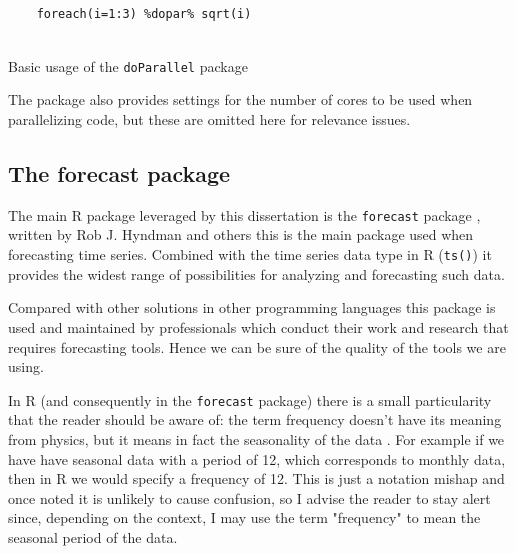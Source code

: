 \documentclass[12pt,a4paper,titlepage]{report}
\begin{document}
\begin{listing}[h]
    \begin{verbatim}
    
    foreach(i=1:3) %dopar% sqrt(i)    
    
    \end{verbatim}
    
    \caption{Basic usage of the \texttt{doParallel} package}
    \label{exampleparallelcode}
\end{listing}

The package also provides settings for the number of cores to be used when parallelizing code, but these are omitted here for relevance issues.

\subsection{The forecast package} \label{forecastpackagesection}

The main R package leveraged by this dissertation is the \texttt{forecast} package \cite{forecastpackagemanual}, written by Rob J. Hyndman and others \cite{forecastpackagearticle} this is the main package used when forecasting time series.
Combined with the time series data type in R (\texttt{ts()}) it provides the widest range of possibilities for analyzing and forecasting such data.

Compared with other solutions in other programming languages this package is used and maintained by professionals which conduct their work and research that requires forecasting tools. Hence we can be sure of the quality of the tools we are using.

In R (and consequently in the \texttt{forecast} package) there is a small particularity that the reader should be aware of: the term frequency doesn't have its meaning from physics, but it means in fact the seasonality of the data \cite{hyndmanseasonalperiods}.
For example if we have have seasonal data with a period of 12, which corresponds to monthly data, then in R we would specify a frequency of 12.
This is just a notation mishap and once noted it is unlikely to cause confusion, so I advise the reader to stay alert since, depending on the context, I may use the term "frequency" to mean the seasonal period of the data.
\end{document}
